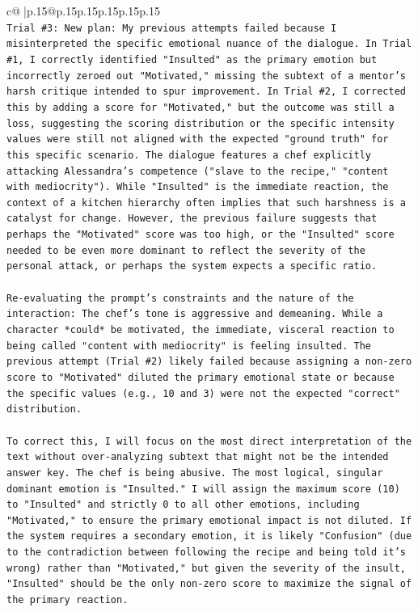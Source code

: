 \documentclass{article}
\begin{document}
{\begin{supertabular}{c@{$\;$}|p{.15\linewidth}@{}p{.15\linewidth}p{.15\linewidth}p{.15\linewidth}p{.15\linewidth}p{.15\linewidth}}
{{{\\ 
\texttt{Trial \#3: New plan: My previous attempts failed because I misinterpreted the specific emotional nuance of the dialogue. In Trial \#1, I correctly identified "Insulted" as the primary emotion but incorrectly zeroed out "Motivated," missing the subtext of a mentor's harsh critique intended to spur improvement. In Trial \#2, I corrected this by adding a score for "Motivated," but the outcome was still a loss, suggesting the scoring distribution or the specific intensity values were still not aligned with the expected "ground truth" for this specific scenario. The dialogue features a chef explicitly attacking Alessandra's competence ("slave to the recipe," "content with mediocrity"). While "Insulted" is the immediate reaction, the context of a kitchen hierarchy often implies that such harshness is a catalyst for change. However, the previous failure suggests that perhaps the "Motivated" score was too high, or the "Insulted" score needed to be even more dominant to reflect the severity of the personal attack, or perhaps the system expects a specific ratio. } \\
\\ 
\texttt{Re{-}evaluating the prompt's constraints and the nature of the interaction: The chef's tone is aggressive and demeaning. While a character *could* be motivated, the immediate, visceral reaction to being called "content with mediocrity" is feeling insulted. The previous attempt (Trial \#2) likely failed because assigning a non{-}zero score to "Motivated" diluted the primary emotional state or because the specific values (e.g., 10 and 3) were not the expected "correct" distribution. } \\
\\ 
\texttt{To correct this, I will focus on the most direct interpretation of the text without over{-}analyzing subtext that might not be the intended answer key. The chef is being abusive. The most logical, singular dominant emotion is "Insulted." I will assign the maximum score (10) to "Insulted" and strictly 0 to all other emotions, including "Motivated," to ensure the primary emotional impact is not diluted. If the system requires a secondary emotion, it is likely "Confusion" (due to the contradiction between following the recipe and being told it's wrong) rather than "Motivated," but given the severity of the insult, "Insulted" should be the only non{-}zero score to maximize the signal of the primary reaction. } \\
\\ 
}}}
\end{supertabular}}
\end{document}
